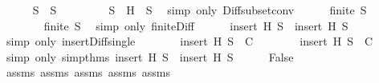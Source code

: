 \begin{isabellebody}
\ \ \ \ \isamarkupfalse%
\ {}{\isacharcolon}{\isachardoublequoteopen}{\isacharquery}S{}\ {\isasymsubseteq}\ S{\isachardoublequoteclose}\ \isanewline
\ \ \ \ \ \ \isamarkupfalse%
\ {\isacartoucheopen}S{}\ {\isasymsubseteq}\ {\isacharbraceleft}H{\isacharbraceright}\ {\isasymunion}\ S{\isacartoucheclose}\ \isamarkupfalse%
\ {\isacharparenleft}simp\ only{\isacharcolon}\ Diff{\isacharunderscore}subset{\isacharunderscore}conv{\isacharparenright}\isanewline
\ \ \ \ \isamarkupfalse%
\ {}{\isacharcolon}{\isachardoublequoteopen}finite\ {\isacharquery}S{}{\isachardoublequoteclose}\ \isanewline
\ \ \ \ \ \ \isamarkupfalse%
\ {\isacartoucheopen}finite\ S{}{\isacartoucheclose}\ \isamarkupfalse%
\ {\isacharparenleft}simp\ only{\isacharcolon}\ finite{\isacharunderscore}Diff{\isacharparenright}\isanewline
\ \ \ \ \isamarkupfalse%
\ {\isachardoublequoteopen}insert\ H\ {\isacharquery}S{}\ {\isacharequal}\ insert\ H\ S{}{\isachardoublequoteclose}\isanewline
\ \ \ \ \ \ \isamarkupfalse%
\ {\isacharparenleft}simp\ only{\isacharcolon}\ insert{\isacharunderscore}Diff{\isacharunderscore}single{\isacharparenright}\isanewline
\ \ \ \ \isamarkupfalse%
\ \isamarkupfalse%
\ {}{\isacharcolon}{\isachardoublequoteopen}insert\ H\ {\isacharquery}S{}\ {\isasymnotin}\ C{\isachardoublequoteclose}\isanewline
\ \ \ \ \ \ \isamarkupfalse%
\ {\isacartoucheopen}insert\ H\ S{}\ {\isasymnotin}\ C{\isacartoucheclose}\ \isamarkupfalse%
\ {\isacharparenleft}simp\ only{\isacharcolon}\ simp{\isacharunderscore}thms{\isacharparenleft}{}{\isacharcomma}{}{\isacharparenright}\ {\isacartoucheopen}insert\ H\ {\isacharquery}S{}\ {\isacharequal}\ insert\ H\ S{}{\isacartoucheclose}{\isacharparenright}\isanewline
\ \ \ \ \isamarkupfalse%
\ {\isachardoublequoteopen}False{\isachardoublequoteclose}\isanewline
\ \ \ \ \ \ \isamarkupfalse%
\ assms{\isacharparenleft}{}{\isacharparenright}\ assms{\isacharparenleft}{}{\isacharparenright}\ assms{\isacharparenleft}{}{\isacharparenright}\ assms{\isacharparenleft}{}{\isacharparenright}\ assms{\isacharparenleft}{}{\isacharparenright}\ {}\ {}\ {}\ {}\ {}\ {}\ \isamarkupfalse%

\end{isabellebody}
